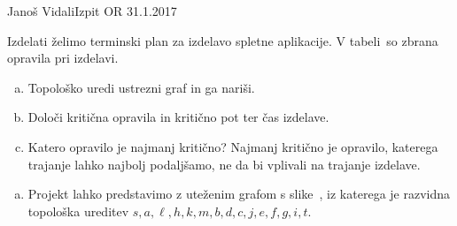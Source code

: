 \begin{naloga}{Janoš Vidali}{Izpit OR 31.1.2017}
\begin{vprasanje}
Izdelati želimo terminski plan za izdelavo spletne aplikacije.
V tabeli~\tab so zbrana opravila pri izdelavi.

\begin{enumerate}[(a)]
\item Topološko uredi ustrezni graf in ga nariši.
\item Določi kritična opravila in kritično pot ter čas izdelave.
\item Katero opravilo je najmanj kritično?
Najmanj kritično je opravilo, katerega trajanje lahko najbolj podaljšamo,
ne da bi vplivali na trajanje izdelave.
\end{enumerate}

\begin{tabela}
\end{tabela}
\end{vprasanje}

\begin{odgovor}
\begin{enumerate}[(a)]
\item Projekt lahko predstavimo z uteženim grafom s slike~\fig,
iz katerega je razvidna topološka ureditev
$s, a, \ell, h, k, m, b, d, c, j, e, f, g, i, t$.


\end{enumerate}
\end{odgovor}
\end{naloga}
